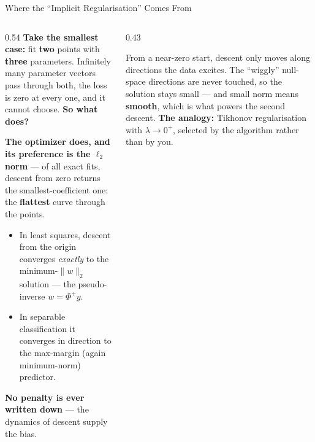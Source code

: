 \begin{frame}{Where the ``Implicit Regularisation'' Comes From}
\begin{columns}[T]
\begin{column}{0.54\textwidth}
\small
\textbf{Take the smallest case:} fit \textbf{two} points with \textbf{three} parameters. Infinitely many parameter vectors pass through both, the loss is zero at every one, and it cannot choose. \textbf{So what does?}
\smallskip

\textbf{The optimizer does, and its preference is the $\ell_2$ norm} --- of all exact fits, descent from zero returns the smallest-coefficient one: the \textbf{flattest} curve through the points.
\begin{itemize}\small\setlength{\itemsep}{0.6mm}
  \item In least squares, descent from the origin converges \emph{exactly} to the minimum-$\lVert w\rVert_2$ solution --- the pseudo-inverse $w=\Phi^{+}y$.
  \item In separable classification it converges in direction to the max-margin (again minimum-norm) predictor.
\end{itemize}
{\footnotesize \textbf{No penalty is ever written down} --- the dynamics of descent supply the bias.}
\end{column}
\begin{column}{0.43\textwidth}
\begin{conceptbox}[title=\textbf{The mechanism}]\footnotesize
From a near-zero start, descent only moves along directions the data excites. The ``wiggly'' null-space directions are never touched, so the solution stays small --- and small norm means \textbf{smooth}, which is what powers the second descent.
\medskip
\textbf{The analogy:} Tikhonov regularisation with $\lambda\to0^{+}$, selected by the algorithm rather than by you.
\end{conceptbox}
\end{column}
\end{columns}
\vspace{1mm}
\end{frame}

